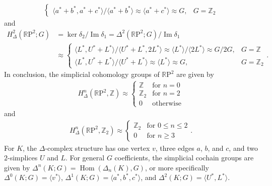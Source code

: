 \documentclass[12pt]{article}
\DeclareMathOperator{\im}{Im}
\DeclareMathOperator{\Hom}{Hom}
\newcommand{\iso}{\approx}
\newcommand{\RP}{\mathbb{R}\mathrm{P}}
\begin{document}
\begin{enumerate}
\begin{enumerate}
\begin{align*}
\begin{cases}
                        \langle a^* + b^*, a^* + c^* \rangle / \langle a^* + b^* \rangle \iso \langle a^* + c^* \rangle \iso G, &G = \mathbb{Z}_2
                    \end{cases}
                \end{align*}
                and
                \begin{align*}
                    H_\Delta^2(\RP^2; G) &= \ker\delta_2 / \im\delta_1 = \Delta^2(\RP^2; G) / \im\delta_1 \\
                    &\iso \begin{cases}
                        \langle L^*, U^* + L^* \rangle / \langle U^* + L^*, 2L^* \rangle \iso \langle L^* \rangle / \langle 2L^* \rangle \iso G/2G, &G = \mathbb{Z} \\
                        \langle L^*, U^* + L^* \rangle / \langle U^* + L^* \rangle \iso \langle L^* \rangle \iso G, &G = \mathbb{Z}_2
                    \end{cases}.
                \end{align*}
                In conclusion, the simplicial cohomology groups of $\RP^2$ are given by
                \begin{align*}
                    H_\Delta^n(\RP^2, \mathbb{Z}) \iso \begin{cases}
                        \mathbb{Z} &\text{for } n = 0 \\
                        \mathbb{Z}_2 &\text{for } n = 2 \\
                        0 &\text{otherwise}
                    \end{cases}
                \end{align*}
                and
                \begin{align*}
                    H_\Delta^n(\RP^2, \mathbb{Z}_2) \iso \begin{cases}
                        \mathbb{Z}_2 &\text{for } 0 \leq n \leq 2 \\
                        0 &\text{for } n \geq 3
                    \end{cases}.
                \end{align*}
                For $K$, the $\Delta$-complex structure has one vertex $v$, three edges $a$, $b$, and $c$, and two $2$-simplices $U$ and $L$. For general $G$ coefficients, the simplicial cochain groups are given by $\Delta^n(K; G) = \Hom(\Delta_n(K), G)$, or more specifically $\Delta^0(K; G) = \langle v^* \rangle$, $\Delta^1(K; G) = \langle a^*, b^*, c^* \rangle$, and $\Delta^2(K; G) = \langle U^*, L^* \rangle$. \par

\end{enumerate}
\end{enumerate}
\end{document}
